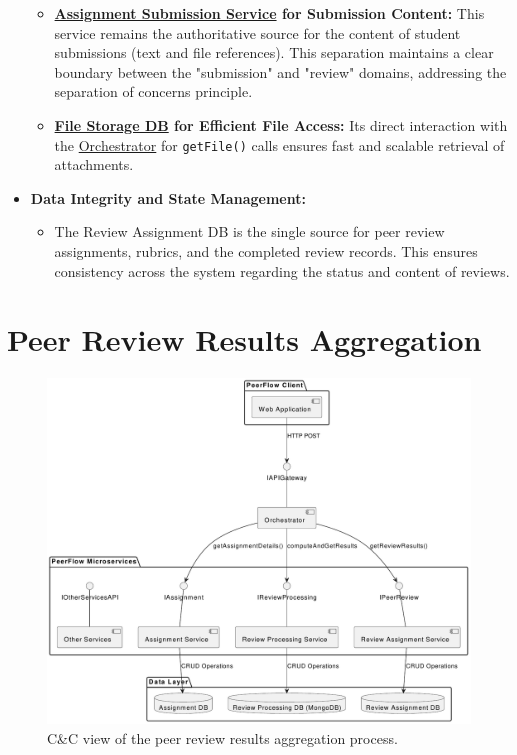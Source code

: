 \begin{itemize}
\begin{itemize}
        \item \textbf{\hyperref[def:AssignmentSubmissionService]{Assignment Submission Service} for Submission Content:} This service remains the authoritative source for the content of student submissions (text and file references). This separation maintains a clear boundary between the "submission" and "review" domains, addressing the separation of concerns principle.
        
        \item \textbf{\hyperref[def:FileStorageService]{File Storage DB} for Efficient File Access:} Its direct interaction with the \hyperref[def:Orchestrator]{Orchestrator} for \texttt{getFile()} calls ensures fast and scalable retrieval of attachments.
    \end{itemize}
    \item \textbf{Data Integrity and State Management:}
    \begin{itemize}
        \item The Review Assignment DB is the single source for peer review assignments, rubrics, and the completed review records. This ensures consistency across the system regarding the status and content of reviews.
    \end{itemize}
\end{itemize}

\clearpage
\section{Peer Review Results Aggregation}

\begin{figure}[h]
    \centering
    \includegraphics[width=0.9\linewidth]{Architettura/imgs/pr_proc_cnc.pdf}
    \caption{C\&C view of the peer review results aggregation process.}
    \label{fig:ccPeerReviewResultsAggregation}
\end{figure}
\clearpage

